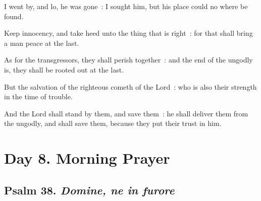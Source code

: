 I went by, and lo, he was gone~: I sought him, but his place could no where be found.\par
{}Keep innocency, and take heed unto the thing that is right~: for that shall bring a man peace at the last.\par
{}As for the transgressors, they shall perish together~: and the end of the ungodly is, they shall be rooted out at the last.\par
{}But the salvation of the righteous cometh of the Lord~: who is also their strength in the time of trouble.\par
{}And the Lord shall stand by them, and save them~: he shall deliver them from the ungodly, and shall save them, because they put their trust in him.\par


\section*{Day 8. Morning Prayer}

\subsection{Psalm 38. \textit{Domine, ne in furore}}

